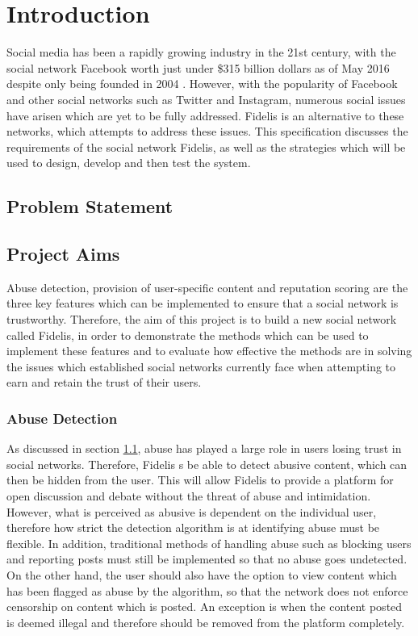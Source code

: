 \chapter{Introduction}
\label{Chapter:Introduction}

Social media has been a rapidly growing industry in the 21st century, with the social network Facebook worth just under \$315 billion dollars as of May 2016 despite only being founded in 2004 \cite{Forbes:Facebook}. However, with the popularity of Facebook and other social networks such as Twitter and Instagram, numerous social issues have arisen which are yet to be fully addressed. Fidelis is an alternative to these networks, which attempts to address these issues. This specification discusses the requirements of the social network Fidelis, as well as the strategies which will be used to design, develop and then test the system.

\section{Problem Statement}
\label{sec:problemstatement}

\section{Project Aims}
Abuse detection, provision of user-specific content and reputation scoring are the three key features which can be implemented to ensure that a social network is trustworthy. Therefore, the aim of this project is to build a new social network called Fidelis, in order to demonstrate the methods which can be used to implement these features and to evaluate how effective the methods are in solving the issues which established social networks currently face when attempting to earn and retain the trust of their users.

\subsection{Abuse Detection}
As discussed in section \ref{sec:problemstatement}, abuse has played a large role in users losing trust in social networks. Therefore, Fidelis s be able to detect abusive content, which can then be hidden from the user. This will allow Fidelis to provide a platform for open discussion and debate without the threat of abuse and intimidation. However, what is perceived as abusive is dependent on the individual user, therefore how strict the detection algorithm is at identifying abuse must be flexible. In addition, traditional methods of handling abuse such as blocking users and reporting posts must still be implemented so that no abuse goes undetected. On the other hand, the user should also have the option to view content which has been flagged as abuse by the algorithm, so that the network does not enforce censorship on content which is posted. An exception is when the content posted is deemed illegal and therefore should be removed from the platform completely.

